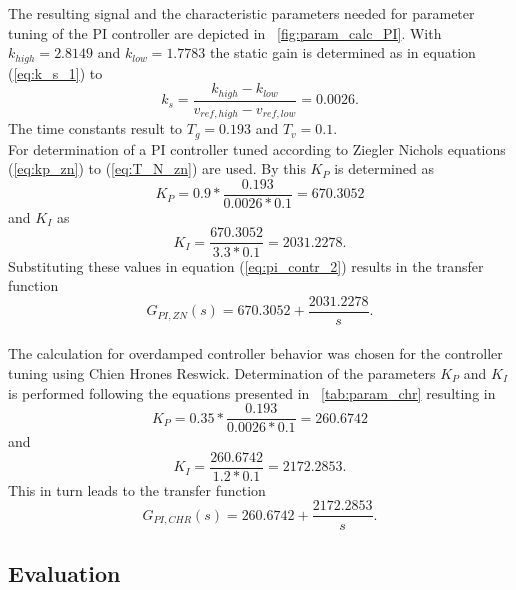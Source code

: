 The resulting signal and the characteristic parameters needed for parameter tuning of the PI controller are depicted in \figurename~\ref{fig:param_calc_PI}. With $k_{high}=2.8149$ and $k_{low}=1.7783$ the static gain is determined as in equation (\ref{eq:k_s_1}) to
\begin{equation}
  k_s = \frac{k_{high}-k_{low}}{v_{ref,high}-v_{ref,low}}= 0.0026.
\label{eq:k_s_2}
\end{equation}
The time constants result to $T_g=0.193$ and $T_v=0.1$.
\\For determination of a PI controller tuned according to Ziegler Nichols equations (\ref{eq:kp_zn}) to (\ref{eq:T_N_zn}) are used. By this $K_{P}$ is determined as
\begin{equation}
  K_{P} = 0.9*\frac{0.193}{0.0026*0.1}=670.3052
\end{equation}
and $K_I$ as
\begin{equation}
  K_{I}  = \frac{670.3052}{3.3*0.1}=2031.2278.
\end{equation}
Substituting these values in equation (\ref{eq:pi_contr_2}) results in the transfer function
\begin{equation}
  G_{PI,ZN}(s)=670.3052+\frac{2031.2278}{s}.
\end{equation}
\\The calculation for overdamped controller behavior was chosen for the controller tuning using Chien Hrones Reswick. Determination of the parameters $K_P$ and $K_I$ is performed following the equations presented in \tablename~\ref{tab:param_chr} resulting in
\begin{equation}
  K_P = 0.35*\frac{0.193}{0.0026*0.1}=260.6742
\end{equation}
and
\begin{equation}
  K_I = \frac{260.6742}{1.2*0.1}=2172.2853.
\end{equation}
This in turn leads to the transfer function
\begin{equation}
  G_{PI,CHR}(s)=260.6742+\frac{2172.2853}{s}.
\end{equation}
\subsection{Evaluation}

